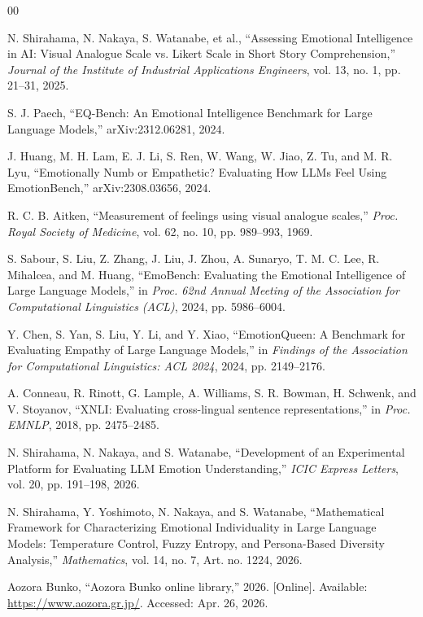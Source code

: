 \documentclass[conference,a4paper]{IEEEtran}
\begin{document}
\begin{thebibliography}{00}

N. Shirahama, N. Nakaya, S. Watanabe, et al., ``Assessing Emotional Intelligence in AI: Visual Analogue Scale vs. Likert Scale in Short Story Comprehension,'' \emph{Journal of the Institute of Industrial Applications Engineers}, vol. 13, no. 1, pp. 21--31, 2025.

S. J. Paech, ``EQ-Bench: An Emotional Intelligence Benchmark for Large Language Models,'' arXiv:2312.06281, 2024.

J. Huang, M. H. Lam, E. J. Li, S. Ren, W. Wang, W. Jiao, Z. Tu, and M. R. Lyu, ``Emotionally Numb or Empathetic? Evaluating How LLMs Feel Using EmotionBench,'' arXiv:2308.03656, 2024.

R. C. B. Aitken, ``Measurement of feelings using visual analogue scales,'' \emph{Proc. Royal Society of Medicine}, vol. 62, no. 10, pp. 989--993, 1969.

S. Sabour, S. Liu, Z. Zhang, J. Liu, J. Zhou, A. Sunaryo, T. M. C. Lee, R. Mihalcea, and M. Huang, ``EmoBench: Evaluating the Emotional Intelligence of Large Language Models,'' in \emph{Proc. 62nd Annual Meeting of the Association for Computational Linguistics (ACL)}, 2024, pp. 5986--6004.

Y. Chen, S. Yan, S. Liu, Y. Li, and Y. Xiao, ``EmotionQueen: A Benchmark for Evaluating Empathy of Large Language Models,'' in \emph{Findings of the Association for Computational Linguistics: ACL 2024}, 2024, pp. 2149--2176.

A. Conneau, R. Rinott, G. Lample, A. Williams, S. R. Bowman, H. Schwenk, and V. Stoyanov, ``XNLI: Evaluating cross-lingual sentence representations,'' in \emph{Proc. EMNLP}, 2018, pp. 2475--2485.

N. Shirahama, N. Nakaya, and S. Watanabe, ``Development of an Experimental Platform for Evaluating LLM Emotion Understanding,'' \emph{ICIC Express Letters}, vol. 20, pp. 191--198, 2026.

N. Shirahama, Y. Yoshimoto, N. Nakaya, and S. Watanabe, ``Mathematical Framework for Characterizing Emotional Individuality in Large Language Models: Temperature Control, Fuzzy Entropy, and Persona-Based Diversity Analysis,'' \emph{Mathematics}, vol. 14, no. 7, Art. no. 1224, 2026.

Aozora Bunko, ``Aozora Bunko online library,'' 2026. [Online]. Available: \url{https://www.aozora.gr.jp/}. Accessed: Apr. 26, 2026.

\end{thebibliography}
\end{document}
